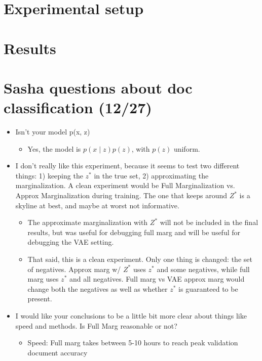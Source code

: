\documentclass[11pt]{article}
\begin{document}
\section{Experimental setup}

\section{Results}






\appendix

\section{Sasha questions about doc classification (12/27)}
\begin{itemize}
\item Isn't your model p(x, z)
    \begin{itemize}
    \item Yes, the model is $p(x\mid z)p(z)$, with $p(z)$ uniform.
    \end{itemize}
\item I don't really like this experiment, because it seems to test two different things:
    1) keeping the $z^*$ in the true set, 2) approximating the marginalization.
    A clean experiment would be Full Marginalization vs. Approx Marginalization during training.
    The one that keeps around $Z^*$ is a skyline at best, and maybe at worst not informative.
    \begin{itemize}
    \item The approximate marginalization with $Z^*$ will not be included in the final results,
        but was useful for debugging full marg and will be useful for debugging the VAE setting.
    \item That said, this is a clean experiment. Only one thing is changed: the set of negatives.
        Approx marg w/ $Z^*$ uses $z^*$ and some negatives,
        while full marg uses $z^*$ and all negatives.
        Full marg vs VAE approx marg would change both the negatives as well as whether $z^*$
            is guaranteed to be present.
    \end{itemize}
\item I would like your conclusions to be a little bit more clear about things like
    speed and methods. Is Full Marg reasonable or not?
    \begin{itemize}
    \item Speed: Full marg takes between 5-10 hours to reach peak validation document accuracy

\end{itemize}
\end{itemize}
\end{document}
